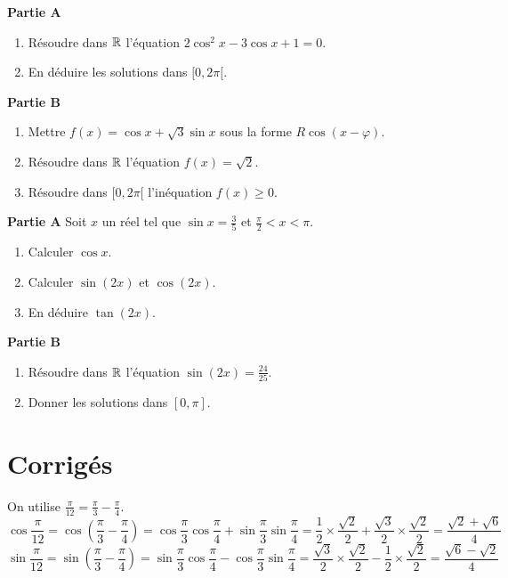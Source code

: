 \noindent\textbf{Partie A}
\begin{enumerate}[label=\arabic*)]
    \item Résoudre dans $\mathbb{R}$ l'équation $2\cos^2 x - 3\cos x + 1 = 0$.
    \item En déduire les solutions dans $[0,2\pi[$.
\end{enumerate}

\textbf{Partie B}
\begin{enumerate}[label=\arabic*)]
    \item Mettre $f(x) = \cos x + \sqrt3\sin x$ sous la forme $R\cos(x-\varphi)$.
    \item Résoudre dans $\mathbb{R}$ l'équation $f(x) = \sqrt2$.
    \item Résoudre dans $[0,2\pi[$ l'inéquation $f(x) \ge 0$.
\end{enumerate}

\noindent\textbf{Partie A}
Soit $x$ un réel tel que $\sin x = \frac{3}{5}$ et $\frac{\pi}{2} < x < \pi$.
\begin{enumerate}[label=\arabic*)]
    \item Calculer $\cos x$.
    \item Calculer $\sin(2x)$ et $\cos(2x)$.
    \item En déduire $\tan(2x)$.
\end{enumerate}

\textbf{Partie B}
\begin{enumerate}[label=\arabic*)]
    \item Résoudre dans $\mathbb{R}$ l'équation $\sin(2x) = \frac{24}{25}$.
    \item Donner les solutions dans $[0,\pi]$.
\end{enumerate}

\section{Corrigés}

On utilise $\frac{\pi}{12} = \frac{\pi}{3} - \frac{\pi}{4}$.
\[
\cos\frac{\pi}{12} = \cos\left(\frac{\pi}{3} - \frac{\pi}{4}\right) = \cos\frac{\pi}{3}\cos\frac{\pi}{4} + \sin\frac{\pi}{3}\sin\frac{\pi}{4} = \frac12\times\frac{\sqrt2}{2} + \frac{\sqrt3}{2}\times\frac{\sqrt2}{2} = \frac{\sqrt2 + \sqrt6}{4}
\]
\[
\sin\frac{\pi}{12} = \sin\left(\frac{\pi}{3} - \frac{\pi}{4}\right) = \sin\frac{\pi}{3}\cos\frac{\pi}{4} - \cos\frac{\pi}{3}\sin\frac{\pi}{4} = \frac{\sqrt3}{2}\times\frac{\sqrt2}{2} - \frac12\times\frac{\sqrt2}{2} = \frac{\sqrt6 - \sqrt2}{4}
\]

